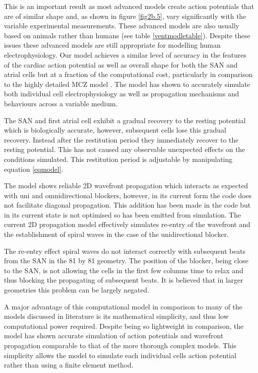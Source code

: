 This is an important result as most advanced models create action potentials that are of similar shape and, as shown in figure \ref{fig2b.5}, vary significantly with the variable experimental measurements. These advanced models are also usually based on animals rather than humans (see table \ref{ventmodletable}). Despite these issues these advanced models are still appropriate for modelling human electrophysiology. Our model achieves a similar level of accuracy in the features of the cardiac action potential as well as overall shape for both the SAN and atrial cells but at a fraction of the computational cost, particularly in comparison to the highly detailed MCZ model \citep{phdpaper}. The model has shown to accurately simulate both individual cell electrophysiology as well as propagation mechanisms and behaviours across a variable medium. \par
The SAN and first atrial cell exhibit a gradual recovery to the resting potential which is biologically accurate, however, subsequent cells lose this gradual recovery. Instead after the restitution period they immediately recover to the resting potential. This has not caused any observable unexpected effects on the conditions simulated. This restitution period is adjustable by manipulating equation \ref{eqmodel}. \par
The model shows reliable 2D wavefront propagation which interacts as expected with uni and omnidirectional blockers, however, in its current form the code does not facilitate diagonal propagation. This addition has been made in the code but in its current state is not optimised so has been emitted from simulation. The current 2D propagation model effectively simulates re-entry of the wavefront and the establishment of spiral waves in the case of the unidirectional blocker. \par
The re-entry effect spiral waves do not interact correctly with subsequent beats from the SAN in the 81 by 81 geometry. The position of the blocker, being close to the SAN, is not allowing the cells in the first few columns time to relax and thus blocking the propagating of subsequent beats. It is believed that in larger geometries this problem can be largely negated. \par
A major advantage of this computational model in comparison to many of the models discussed in literature \citep{phdpaper} is its mathematical simplicity, and thus low computational power required. Despite being so lightweight in comparison, the model has shown accurate simulation of action potentials and wavefront propagation comparable to that of the more thorough complex models. This simplicity allows the model to simulate each individual cells action potential rather than using a finite element method. \par 
